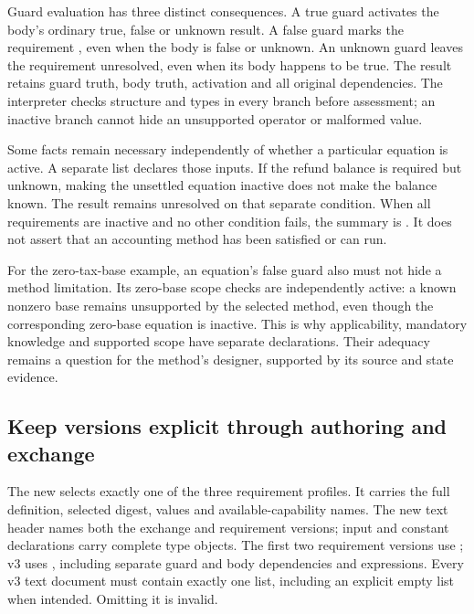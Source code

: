 Guard evaluation has three distinct consequences. A true guard activates the
body's ordinary true, false or unknown result. A false guard marks the requirement
, even when the body is false or unknown. An unknown guard
leaves the requirement unresolved, even when its body happens to be true. The
result retains guard truth, body truth, activation and all original dependencies.
The interpreter checks structure and types in every branch before assessment;
an inactive branch cannot hide an unsupported operator or malformed value.

Some facts remain necessary independently of whether a particular equation is
active. A separate  list declares those inputs. If the
refund balance is required but unknown, making the unsettled equation inactive
does not make the balance known. The result remains unresolved on that separate
condition. When all requirements are inactive and no other condition fails, the
summary is . It does not assert that an accounting
method has been satisfied or can run.

For the zero-tax-base example, an equation's false guard also must not hide a
method limitation. Its zero-base scope checks are independently active: a known
nonzero base remains unsupported by the selected method, even though the
corresponding zero-base equation is inactive. This is why applicability, mandatory
knowledge and supported scope have separate declarations. Their adequacy remains
a question for the method's designer, supported by its source and state evidence.

\subsection{Keep versions explicit through authoring and exchange}

The new  selects exactly one of the three
requirement profiles. It carries the full definition, selected digest, values
and available-capability names. The new text header names both the exchange and
requirement versions; input and constant declarations carry complete type
objects. The first two requirement versions use ; v3 uses
, including separate guard and body dependencies and expressions.
Every v3 text document must contain exactly one  list,
including an explicit empty list when intended. Omitting it is invalid.

